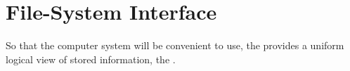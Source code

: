 \section{File-System Interface}\label{sec:FS_Interface}
So that the computer system will be convenient to use, the  provides a uniform logical view of stored information, the .


